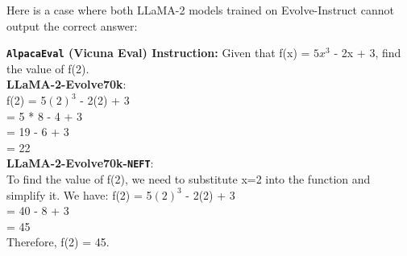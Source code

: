 \documentclass{article} %
\newcommand{\neft}{\texttt{NEFT}}
\newcommand{\llama}{LLaMA}
\begin{document}
Here is a case where both LLaMA-2 models trained on Evolve-Instruct cannot output the correct answer:
\begin{tcolorbox} [boxrule=0pt]
\textbf{\texttt{AlpacaEval} (Vicuna Eval) Instruction:}  Given that f(x) = $5x^3$ - 2x + 3, find the value of f(2). \\
\textbf{\llama{}-2-Evolve70k}: \\
f(2) = 5$(2)^3$ - 2(2) + 3 \\
= 5 * 8 - 4 + 3 \\
= 19 - 6 + 3 \\
= 22 \\
\textbf{\llama{}-2-Evolve70k-\neft{}}: \\
To find the value of f(2), we need to substitute x=2 into the function and simplify it. We have:
f(2) = 5$(2)^3$ - 2(2) + 3 \\
       = 40 - 8 + 3 \\
       = 45 \\
Therefore, f(2) = 45.
\end{tcolorbox}
\end{document}
